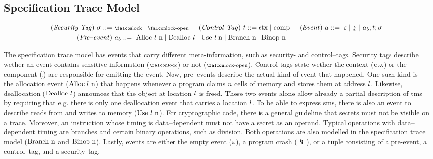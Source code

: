 \documentclass[utf8,acmsmall,review,screen,dvipsnames]{acmart}
\begin{document}
\subsection{Specification Trace Model}\label{subsec:propdefs}

\begin{gather*}
  \begin{aligned}
  \mi{(Security\ Tag)}~\sigma\bnfdef&\ \lock \mid \unlock\hspace{0.5cm}
  \mi{(Control\ Tag)}~\sandboxtag\bnfdef \ctx\mid\comp\hspace{0.5cm}
  \mi{(Event)}~\event\bnfdef\ \emptyevent \mid \lightning \mid \event[_{b}];\sandboxtag;\sigma \\
  \mi{(Pre\text{--}event)}&~\event[_{b}]\bnfdef\ \ev{Alloc\ \loc\ n} \mid \ev{Dealloc\ \loc} \mid \ev{Use\ \loc\ n} \mid \ev{Branch\ n} \mid \ev{Binop\ n} \\
  \end{aligned}
\end{gather*}

The specification trace model has events that carry different meta-information, such as security- and control--tags.
Security tags describe wether an event contains sensitive information ($\lock$) or not ($\unlock$).
Control tags state wether the context ($\text{ctx}$) or the component ($\comp$) are responsible for emitting the event.
Now, pre--events describe the actual kind of event that happened.
One such kind is the allocation event ($\text{Alloc\ \ensuremath l\ n}$) that happens whenever a program claims $n$ cells of memory and stores them at address $l$.
Likewise, deallocation ($\text{Dealloc\ \ensuremath l}$) announces that the object at location $l$ is freed.
These two events alone allow already a partial description of \gls{tms} by requiring that e.g. there is only one deallocation event that carries a location $l$.
To be able to express \gls{sms}, there is also an event to describe reads from and writes to memory ($\text{Use\ \ensuremath l\ n}$).
For cryptographic code, there is a general guideline that secrets must not be visible on a trace.
Moreover, an instruction whose timing is data--dependent must not have a secret as an operand.
Typical operations with data--dependent timing are branches and certain binary operations, such as division.
Both operations are also modelled in the specification trace model ($\text{Branch\ n}$ and $\text{Binop\ n}$).
Lastly, events are either the empty event ($\varepsilon$), a program crash ($\lightning$), or a tuple consisting of a pre-event, a control--tag, and a security--tag.
\end{document}
